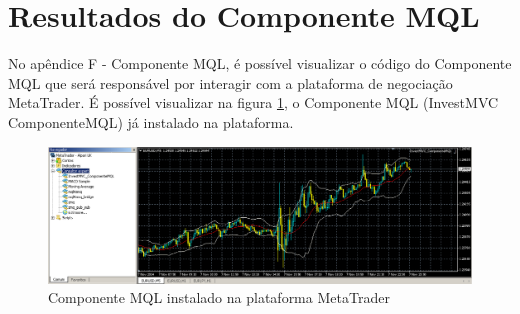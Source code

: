 \section{Resultados do Componente MQL}

No apêndice F - Componente MQL, é possível visualizar o código do Componente MQL que será responsável por interagir com a plataforma de negociação MetaTrader. É possível visualizar na figura \ref{componenteMQL}, o Componente MQL  (InvestMVC ComponenteMQL) já instalado na plataforma.

\begin{figure}[H]
\centering
\includegraphics[width=1.0\textwidth]{figuras/componenteMQL}
\caption{Componente MQL instalado na plataforma MetaTrader}
\label{componenteMQL}
\end{figure}